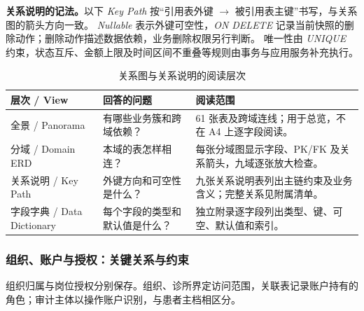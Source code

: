 \noindent\textbf{关系说明的记法。}\quad 以下 \emph{Key Path} 按“引用表外键 $\rightarrow$ 被引用表主键”书写，与关系图的箭头方向一致。
\emph{Nullable} 表示外键可空性，\emph{ON DELETE} 记录当前快照的删除动作；删除动作描述数据依赖，业务删除权限另行判断。
唯一性由 \emph{UNIQUE} 约束，状态互斥、金额上限及时间区间不重叠等规则由事务与应用服务补充执行。

\begin{table}[!htbp]\centering\small
\caption{关系图与关系说明的阅读层次}\label{tab:erd-reading-levels}
\begin{tabular}{@{}L{30mm}L{50mm}L{69mm}@{}}\toprule
层次 / View & 回答的问题 & 阅读范围\\\midrule
全景 / Panorama & 有哪些业务簇和跨域依赖？ & 61 张表及跨域连线；用于总览，不在 A4 上逐字段阅读。\\
分域 / Domain ERD & 本域的表怎样相连？ & 每张分域图显示字段、PK/FK 及关系箭头，九域逐张放大检查。\\
关系说明 / Key Path & 外键方向和可空性是什么？ & 九张关系说明表列出主链约束及业务含义；完整关系见附属清单。\\
字段字典 / Data Dictionary & 每个字段的类型和默认值是什么？ & 独立附录逐字段列出类型、键、可空、默认值和索引。\\
\bottomrule\end{tabular}\end{table}

\subsubsection{组织、账户与授权：关键关系与约束}
组织归属与岗位授权分别保存。组织、诊所界定访问范围，关联表记录账户持有的角色；审计主体以操作账户识别，与患者主档相区分。

